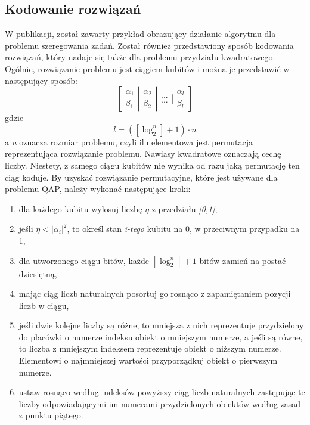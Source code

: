 \subsection{Kodowanie rozwiązań}
W publikacji, został zawarty przykład obrazujący działanie algorytmu dla problemu szeregowania zadań. Został również przedstawiony sposób kodowania rozwiązań, który nadaje się także dla problemu przydziału kwadratowego. Ogólnie, rozwiązanie problemu jest ciągiem kubitów i można je przedstawić w następujący sposób:
\newline
\begin{equation}
\left[ \begin{array}{ccc} \alpha_1 \\ \beta_1 \end{array} \right| \left. \begin{array}{ccc} \alpha_2 \\ \beta_2 \end{array}  \right| \left. \begin{array}{ccc} ... \\ ... \end{array}  \right| \left. \begin{array}{ccc} \alpha_l \\ \beta_l \end{array}  \right]
\end{equation}
\newline
gdzie 
\newline
\begin{equation}
l=([\log_2^n] + 1)\cdot n
\end{equation}
\newline
a \textit{n} oznacza rozmiar problemu, czyli ilu elementowa jest permutacja reprezentująca rozwiązanie problemu. Nawiasy kwadratowe oznaczają cechę liczby.
Niestety, z samego ciągu kubitów nie wynika od razu jaką permutację ten ciąg koduje. By uzyskać rozwiązanie permutacyjne, które jest używane dla problemu QAP, należy wykonać następujące kroki:
\begin{enumerate}
\item dla każdego kubitu wylosuj liczbę $\eta$ z przedziału \textit{[0,1]},
\item jeśli $\eta < |\alpha_i|^2$, to określ stan \textit{i-tego} kubitu na 0, w przeciwnym przypadku na 1,
\item dla utworzonego ciągu bitów, każde $[\log_2^n] + 1$ bitów zamień na postać dziesiętną,
\item mając ciąg liczb naturalnych posortuj go rosnąco z zapamiętaniem pozycji liczb w ciągu,
\item jeśli dwie kolejne liczby są różne, to mniejsza z nich reprezentuje przydzielony do placówki o numerze indeksu obiekt o mniejszym numerze, a jeśli są równe, to liczba z mniejszym indeksem reprezentuje obiekt o niższym numerze. Elementowi o najmniejszej wartości przyporządkuj obiekt o pierwszym numerze.
\item ustaw rosnąco według indeksów powyższy ciąg liczb naturalnych zastępując te liczby odpowiadającymi im numerami przydzielonych obiektów według zasad z punktu piątego.
\end{enumerate}
